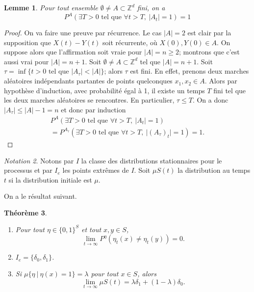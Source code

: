 \documentclass[a4paper,11pt]{article}
\theoremstyle{break}
\theoremstyle{break}
\newtheorem{theorem}{Théorème}[section]
\newtheorem{lemma}[theorem]{Lemme}
\theoremstyle{definition}
\theoremstyle{remark}
\newtheorem{notation}[theorem]{Notation}
\begin{document}
\begin{lemma}
Pour tout ensemble $\emptyset\neq A\subset\mathbb{Z}^d$ fini, on a
$$
P^A(\exists T> 0 \text{ tel que } \forall t>T, \ \vert A_t \vert = 1 )=1
$$
\end{lemma}
\begin{proof}
On va faire une preuve par récurrence. Le cas $\vert A \vert = 2 $ est clair par la supposition que $X(t)-Y(t)$ soit récurrente, où $X(0),Y(0)\in A$. On suppose alors que l'affirmation soit vraie pour $\vert A \vert = n\geqslant 2 $; montrons que c'est aussi vrai pour $\vert A \vert = n+1 $. Soit $\emptyset\neq A\subset\mathbb{Z}^d$ tel que $\vert A \vert = n+1 $. Soit $\tau=\inf\{ t>0 \text{ tel que } \vert A_\tau \vert < \vert A\vert\}$; alors $\tau$ est fini. En effet, prenons deux marches aléatoires indépendants partantes de points quelconques $x_1, x_2\in A$. Alors par hypothèse d'induction, avec probabilité égal à 1, il existe un temps $T$ fini tel que les deux marches aléatoires se rencontres. En particulier, $\tau \leq T$. On a donc $\vert A_\tau \vert \leq \vert A \vert -1 = n$ et donc par induction%
\begin{multline*}
P^A(\exists T> 0 \text{ tel que } \forall t>T, \ \vert A_t \vert = 1 ) \\ =P^{A_\tau}(\exists T> 0 \text{ tel que } \forall t>T, \ \vert {(A_\tau)}_t \vert = 1 )=1.
\end{multline*}
\end{proof}

\begin{notation}
Notons par $I$ la classe des distributions stationnaires pour le processus et par $I_e$ les points extrêmes de $I$. Soit $\mu S(t)$ la distribution au temps $t$ si la distribution initiale est $\mu$. 
\end{notation}

On a le résultat suivant.

\begin{theorem}
\begin{enumerate}
\item Pour tout $\eta \in \{0,1\}^S$ et tout $x,y\in S$,
$$
\lim_{t\to\infty} P^\eta (\eta_t(x) \neq \eta_t(y))=0.
$$
\item $I_e =\{ \delta_0 , \delta_1\}$.
\item Si $\mu\{\eta\ \vert \ \eta(x)=1\}=\lambda$ pour tout $x\in S$, alors
$$
\lim_{t\to\infty} \mu S(t)=\lambda \delta_1 + (1-\lambda ) \delta_0.
$$ 
\end{enumerate}
\end{theorem}
\end{document}
